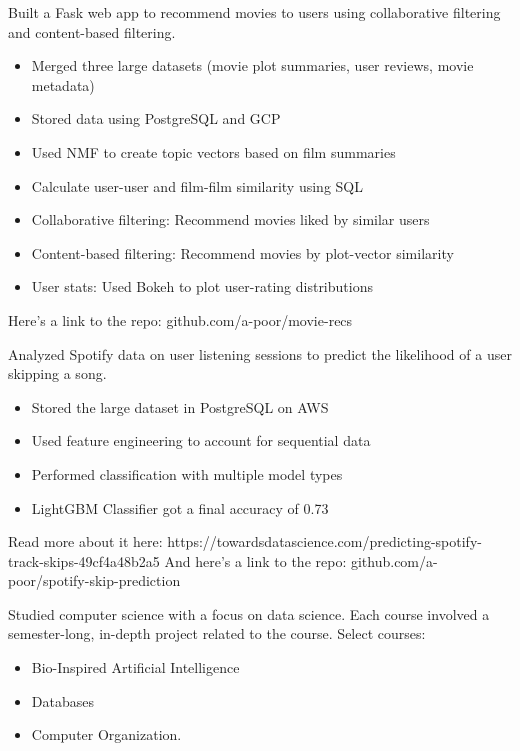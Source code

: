 \documentclass[8pt,letter,ragged2e]{altacv}
\begin{document}
Built a Fask web app to recommend movies to users using collaborative filtering and content-based filtering.
\begin{itemize}
    \item Merged three large datasets (movie plot summaries, user reviews, movie metadata)
    \item Stored data using PostgreSQL and GCP
    \item Used NMF to create topic vectors based on film summaries
    \item Calculate user-user and film-film similarity using SQL
    \item Collaborative filtering: Recommend movies liked by similar users
    \item Content-based filtering: Recommend movies by plot-vector similarity
    \item User stats: Used Bokeh to plot user-rating distributions
\end{itemize}
Here's a link to the repo: github.com/a-poor/movie-recs
\vspace{2px}

Analyzed Spotify data on user listening sessions to predict the likelihood of a user skipping a song.
\begin{itemize}
    \item Stored the large dataset in PostgreSQL on AWS
    \item Used feature engineering to account for sequential data
    \item Performed classification with multiple model types
    \item LightGBM Classifier got a final accuracy of 0.73
\end{itemize}
Read more about it here: https://towardsdatascience.com/predicting-spotify-track-skips-49cf4a48b2a5
And here's a link to the repo: github.com/a-poor/spotify-skip-prediction
\vspace{2px}










Studied computer science with a focus on data science. Each course involved a semester-long, in-depth project related to the course. Select courses:
\vspace{-10px}
\begin{multicols}{3}
    \begin{itemize}
        \item Bio-Inspired Artificial Intelligence
        \item Databases
        \item Computer Organization.
    \end{itemize}
\end{multicols}
\vspace{-10px}
\end{document}
